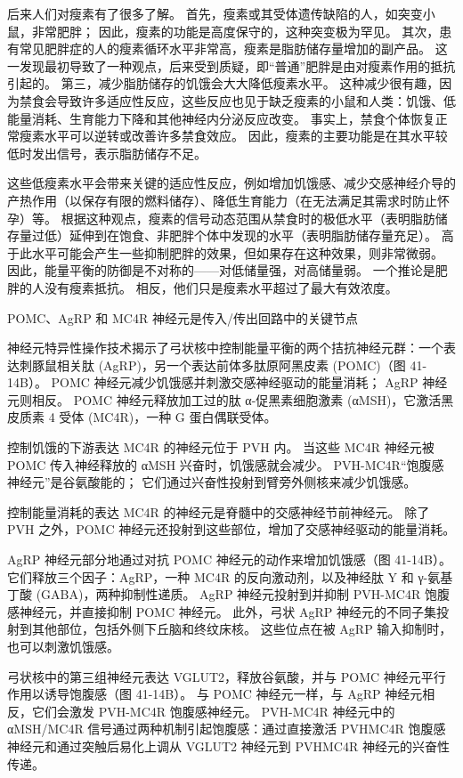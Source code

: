 后来人们对瘦素有了很多了解。 首先，瘦素或其受体遗传缺陷的人，如突变小鼠，非常肥胖； 因此，瘦素的功能是高度保守的，这种突变极为罕见。 其次，患有常见肥胖症的人的瘦素循环水平非常高，瘦素是脂肪储存量增加的副产品。 这一发现最初导致了一种观点，后来受到质疑，即“普通”肥胖是由对瘦素作用的抵抗引起的。 第三，减少脂肪储存的饥饿会大大降低瘦素水平。 这种减少很有趣，因为禁食会导致许多适应性反应，这些反应也见于缺乏瘦素的小鼠和人类：饥饿、低能量消耗、生育能力下降和其他神经内分泌反应改变。 事实上，禁食个体恢复正常瘦素水平可以逆转或改善许多禁食效应。 因此，瘦素的主要功能是在其水平较低时发出信号，表示脂肪储存不足。

这些低瘦素水平会带来关键的适应性反应，例如增加饥饿感、减少交感神经介导的产热作用（以保存有限的燃料储存）、降低生育能力（在无法满足其需求时防止怀孕）等。 根据这种观点，瘦素的信号动态范围从禁食时的极低水平（表明脂肪储存量过低）延伸到在饱食、非肥胖个体中发现的水平（表明脂肪储存量充足）。 高于此水平可能会产生一些抑制肥胖的效果，但如果存在这种效果，则非常微弱。 因此，能量平衡的防御是不对称的——对低储量强，对高储量弱。 一个推论是肥胖的人没有瘦素抵抗。 相反，他们只是瘦素水平超过了最大有效浓度。

POMC、AgRP 和 MC4R 神经元是传入/传出回路中的关键节点

神经元特异性操作技术揭示了弓状核中控制能量平衡的两个拮抗神经元群：一个表达刺豚鼠相关肽 (AgRP)，另一个表达前体多肽原阿黑皮素 (POMC)（图 41-14B）。 POMC 神经元减少饥饿感并刺激交感神经驱动的能量消耗； AgRP 神经元则相反。 POMC 神经元释放加工过的肽 α-促黑素细胞激素 (αMSH)，它激活黑皮质素 4 受体 (MC4R)，一种 G 蛋白偶联受体。

控制饥饿的下游表达 MC4R 的神经元位于 PVH 内。 当这些 MC4R 神经元被 POMC 传入神经释放的 αMSH 兴奋时，饥饿感就会减少。 PVH-MC4R“饱腹感神经元”是谷氨酸能的； 它们通过兴奋性投射到臂旁外侧核来减少饥饿感。

控制能量消耗的表达 MC4R 的神经元是脊髓中的交感神经节前神经元。 除了 PVH 之外，POMC 神经元还投射到这些部位，增加了交感神经驱动的能量消耗。

AgRP 神经元部分地通过对抗 POMC 神经元的动作来增加饥饿感（图 41-14B）。 它们释放三个因子：AgRP，一种 MC4R 的反向激动剂，以及神经肽 Y 和 γ-氨基丁酸 (GABA)，两种抑制性递质。 AgRP 神经元投射到并抑制 PVH-MC4R 饱腹感神经元，并直接抑制 POMC 神经元。 此外，弓状 AgRP 神经元的不同子集投射到其他部位，包括外侧下丘脑和终纹床核。 这些位点在被 AgRP 输入抑制时，也可以刺激饥饿感。

弓状核中的第三组神经元表达 VGLUT2，释放谷氨酸，并与 POMC 神经元平行作用以诱导饱腹感（图 41-14B）。 与 POMC 神经元一样，与 AgRP 神经元相反，它们会激发 PVH-MC4R 饱腹感神经元。 PVH-MC4R 神经元中的 αMSH/MC4R 信号通过两种机制引起饱腹感：通过直接激活 PVHMC4R 饱腹感神经元和通过突触后易化上调从 VGLUT2 神经元到 PVHMC4R 神经元的兴奋性传递。

